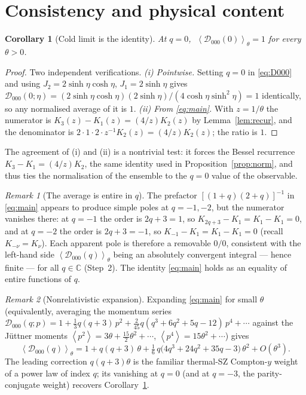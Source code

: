 \documentclass[11pt]{article}
\newtheorem{corollary}{Corollary}
\theoremstyle{definition}
\theoremstyle{remark}
\newtheorem{remark}{Remark}
\newcommand{\Do}{\mathcal{D}}
\newcommand{\avg}[1]{\left\langle #1 \right\rangle}
\newcommand{\Cx}{\mathbb{C}}
\begin{document}
\section{Consistency and physical content}
\label{sec:checks}

\begin{corollary}[Cold limit is the identity]
\label{cor:q0}
At $q=0$, $\;\avg{\Do_{000}(0)}_\theta=1$ for every $\theta>0$.
\end{corollary}
\begin{proof}
Two independent verifications. \emph{(i) Pointwise.} Setting $q=0$ in \eqref{eq:D000} and using
$J_2=2\sinh\eta\cosh\eta$, $J_1=2\sinh\eta$ gives $\Do_{000}(0;\eta)=(2\sinh\eta\cosh\eta)(2\sinh\eta)/(4\cosh\eta\sinh^2\eta)=1$
identically, so any normalised average of it is $1$. \emph{(ii) From \eqref{eq:main}.} With $z=1/\theta$ the
numerator is $K_3(z)-K_1(z)=(4/z)K_2(z)$ by Lemma~\ref{lem:recur}, and the denominator is $2\cdot1\cdot2\cdot z^{-1}K_2(z)=(4/z)K_2(z)$;
the ratio is $1$.
\end{proof}

The agreement of (i) and (ii) is a nontrivial test: it forces the Bessel recurrence $K_3-K_1=(4/z)K_2$, the same
identity used in Proposition~\ref{prop:norm}, and thus ties the normalisation of the ensemble to the $q=0$ value
of the observable.

\begin{remark}[The average is entire in $q$]
\label{rem:entire}
The prefactor $[(1+q)(2+q)]^{-1}$ in \eqref{eq:main} appears to produce simple poles at $q=-1,-2$, but the
numerator vanishes there: at $q=-1$ the order is $2q+3=1$, so $K_{2q+3}-K_1=K_1-K_1=0$, and at $q=-2$ the order is
$2q+3=-1$, so $K_{-1}-K_1=K_1-K_1=0$ (recall $K_{-\nu}=K_\nu$). Each apparent pole is therefore a removable
$0/0$, consistent with the left-hand side $\avg{\Do_{000}(q)}_\theta$ being an absolutely convergent integral
--- hence finite --- for all $q\in\Cx$ (Step~2). The identity \eqref{eq:main} holds as an equality of entire
functions of $q$.
\end{remark}

\begin{remark}[Nonrelativistic expansion]
\label{rem:nr}
Expanding \eqref{eq:main} for small $\theta$ (equivalently, averaging the momentum series
$\Do_{000}(q;p)=1+\tfrac13 q(q+3)\,p^2+\tfrac{2}{45}q(q^3+6q^2+5q-12)\,p^4+\cdots$ against the J\"uttner moments
$\avg{p^2}=3\theta+\tfrac{15}{2}\theta^2+\cdots$, $\avg{p^4}=15\theta^2+\cdots$) gives
\begin{equation}
  \avg{\Do_{000}(q)}_\theta
  = 1 + q(q+3)\,\theta + \tfrac16\,q\big(4q^3+24q^2+35q-3\big)\,\theta^2 + O(\theta^3).
\end{equation}
The leading correction $q(q+3)\theta$ is the familiar thermal-SZ Compton-$y$ weight of a power law of index $q$;
its vanishing at $q=0$ (and at $q=-3$, the parity-conjugate weight) recovers Corollary~\ref{cor:q0}.
\end{remark}
\end{document}
